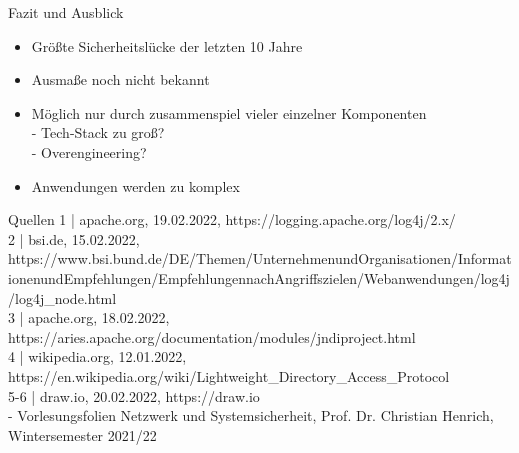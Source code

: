 \documentclass{beamer}
\begin{document}
\begin{frame}{Fazit und Ausblick}
 \begin{itemize}
  \item Größte Sicherheitslücke der letzten 10 Jahre
  \item Ausmaße noch nicht bekannt
  \item Möglich nur durch zusammenspiel vieler einzelner Komponenten\\
  - Tech-Stack zu groß?\\
  - Overengineering?
  \item  Anwendungen werden zu komplex\\
  
 \end{itemize}

\end{frame}
\begin{frame}{Quellen}
1 | apache.org, 19.02.2022, https://logging.apache.org/log4j/2.x/ \\
2 | bsi.de, 15.02.2022, https://www.bsi.bund.de/DE/Themen/Unternehmen\-und\-Organisationen/Informationen\-und\-Empfehlungen/Empfehlungen\-nach\-Angriffszielen/Webanwendungen/log4j/log4j\_node.html \\
3 | apache.org, 18.02.2022, https://aries.apache.org/documentation/modules/jndiproject.html\\
4 | wikipedia.org, 12.01.2022, https://en.wikipedia.org/wiki/Lightweight\_Directory\_Access\_Protocol\\
5-6 | draw.io, 20.02.2022, https://draw.io\\ 
- Vorlesungsfolien Netzwerk und Systemsicherheit, Prof. Dr. Christian Henrich, Wintersemester 2021/22
\end{frame}
\end{document}
